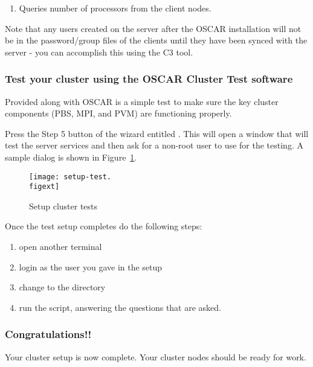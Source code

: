 \begin{enumerate}
\item Queries number of processors from the client nodes.
  
\end{enumerate}

  Note that any users created on the server after the OSCAR
  installation will not be in the password/group files of the clients
  until they have been synced with the server - you can accomplish
  this using the C3  tool.


\subsubsection{Test your cluster using the OSCAR Cluster Test
  software}
\label{det:testcluster}
            
Provided along with OSCAR is a simple test to make sure the key
cluster components (PBS, MPI, and PVM) are functioning properly. 

Press the Step 5 button of the wizard entitled . This will open a window that will test 
 the server services and then ask for a non-root user to use for the
 testing. A sample dialog is shown in Figure~\ref{fig:detailed-setup-test}.


\begin{figure}[htbp]
  \begin{center}
    \texttt{[image: setup-test.\\figext]}
    \caption{Setup cluster tests}
    \label{fig:detailed-setup-test}
  \end{center}
\end{figure}
 
 Once the test setup completes do the following steps:
\begin{enumerate}
 \item open another terminal 
 \item login as the user you gave in the setup
 \item change to the  directory
 \item run the  script, answering the questions
 that are asked.
\end{enumerate}

\subsubsection{Congratulations!!}

Your cluster setup is now complete. Your cluster nodes should
be ready for work.
